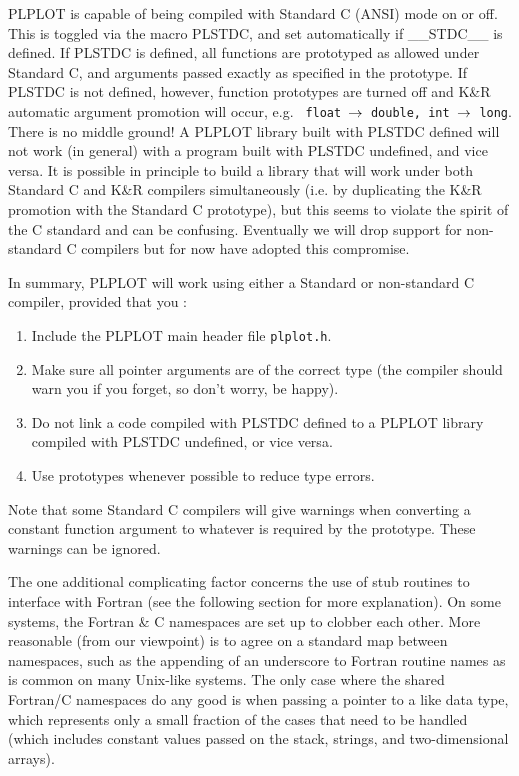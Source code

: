 PLPLOT is capable of being compiled with Standard C (ANSI) mode on or off.
This is toggled via the macro PLSTDC, and set automatically if \_\_STDC\_\_
is defined.  If PLSTDC is defined, all functions are prototyped as allowed
under Standard C, and arguments passed exactly as specified in the
prototype.  If PLSTDC is not defined, however, function prototypes are
turned off and K\&R automatic argument promotion will occur, e.g.  {\tt
float $\rightarrow$ double, int $\rightarrow$ long}.  There is no middle ground!  A PLPLOT
library built with PLSTDC defined will not work (in general) with a program
built with PLSTDC undefined, and vice versa.  It is possible in principle to
build a library that will work under both Standard C and K\&R compilers
simultaneously (i.e.  by duplicating the K\&R promotion with the Standard C
prototype), but this seems to violate the spirit of the C standard and can
be confusing.  Eventually we will drop support for non-standard C compilers 
but for now have adopted this compromise.

In summary, PLPLOT will work using either a Standard or non-standard C
compiler, provided that you :
\begin{enumerate}
\item Include the PLPLOT main header file {\tt plplot.h}.
\item Make sure all pointer arguments are of the correct type
(the compiler should warn you if you forget, so don't worry, be happy).
\item Do not link a code compiled with PLSTDC defined to a PLPLOT library
compiled with PLSTDC undefined, or vice versa.
\item Use prototypes whenever possible to reduce type errors.
\end{enumerate}

Note that some Standard C compilers will give warnings when converting a
constant function argument to whatever is required by the prototype.  These
warnings can be ignored.

The one additional complicating factor concerns the use of stub routines to
interface with Fortran (see the following section for more explanation).  On
some systems, the Fortran \& C namespaces are set up to clobber each other.
More reasonable (from our viewpoint) is to agree on a standard map between
namespaces, such as the appending of an underscore to Fortran routine names
as is common on many Unix-like systems.  The only case where the shared
Fortran/C namespaces do any good is when passing a pointer to a like data
type, which represents only a small fraction of the cases that need to
be handled (which includes constant values passed on the stack, strings, and
two-dimensional arrays).

